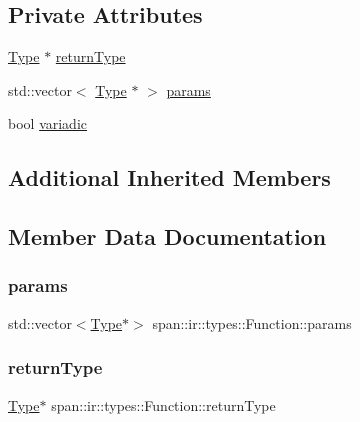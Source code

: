 \subsection*{Private Attributes}
\begin{DoxyCompactItemize}
\item 
\hyperlink{classspan_1_1ir_1_1types_1_1Type}{Type} $\ast$ \hyperlink{classspan_1_1ir_1_1types_1_1Function_a15ff7705df3fde0945e5af56860427fd}{return\+Type}
\item 
std\+::vector$<$ \hyperlink{classspan_1_1ir_1_1types_1_1Type}{Type} $\ast$ $>$ \hyperlink{classspan_1_1ir_1_1types_1_1Function_a8d4a9b7c9cbbfead9d1c7c44bef9bbfd}{params}
\item 
bool \hyperlink{classspan_1_1ir_1_1types_1_1Function_a80c12a5f75fe5c1db469bb0a202987d6}{variadic}
\end{DoxyCompactItemize}
\subsection*{Additional Inherited Members}


\subsection{Member Data Documentation}
\mbox{\label{classspan_1_1ir_1_1types_1_1Function_a8d4a9b7c9cbbfead9d1c7c44bef9bbfd}} 
\subsubsection{\texorpdfstring{params}{params}}
{\footnotesize\ttfamily std\+::vector$<$\hyperlink{classspan_1_1ir_1_1types_1_1Type}{Type}$\ast$$>$ span\+::ir\+::types\+::\+Function\+::params\hspace{0.3cm}{\ttfamily [private]}}

\mbox{\label{classspan_1_1ir_1_1types_1_1Function_a15ff7705df3fde0945e5af56860427fd}} 
\subsubsection{\texorpdfstring{return\+Type}{returnType}}
{\footnotesize\ttfamily \hyperlink{classspan_1_1ir_1_1types_1_1Type}{Type}$\ast$ span\+::ir\+::types\+::\+Function\+::return\+Type\hspace{0.3cm}{\ttfamily [private]}}

